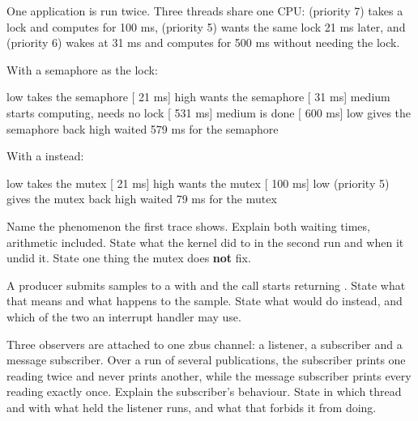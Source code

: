 \label{exa:q:6}

 One application is run twice. Three threads share one CPU:  (priority 7) takes a
lock and computes for 100 ms,  (priority 5) wants the same lock 21 ms later, and
 (priority 6) wakes at 31 ms and computes for 500 ms without needing the lock.

With a semaphore as the lock:

\begin{console}
[   0 ms] low    takes the semaphore
[  21 ms] high   wants the semaphore
[  31 ms] medium starts computing, needs no lock
[ 531 ms] medium is done
[ 600 ms] low    gives the semaphore back
high waited 579 ms for the semaphore
\end{console}

\noindent With a  instead:

\begin{console}
[   0 ms] low    takes the mutex
[  21 ms] high   wants the mutex
[ 100 ms] low    (priority 5) gives the mutex back
high waited 79 ms for the mutex
\end{console}

\noindent Name the phenomenon the first trace shows. Explain both waiting times, arithmetic
included. State what the kernel did to  in the second run and when it undid it. State one
thing the mutex does \textbf{not} fix. 

 A producer submits samples to a  with
 and the call starts returning . State what
that means and what happens to the sample. State what  would do instead, and which
of the two an interrupt handler may use. 

 Three observers are attached to one zbus channel: a listener, a subscriber and a message
subscriber. Over a run of several publications, the subscriber prints one reading twice and never
prints another, while the message subscriber prints every reading exactly once. Explain the
subscriber's behaviour. State in which thread and with what held the listener runs, and what that
forbids it from doing. 

\label{exa:q:7}

